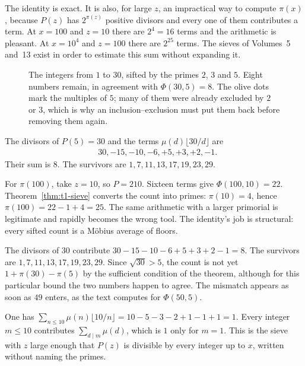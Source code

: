 The identity is exact. It is also, for large $z$, an impractical way to compute $\pi(x)$, because $P(z)$ has $2^{\pi(z)}$ positive divisors and every one of them contributes a term. At $x=100$ and $z=10$ there are $2^4=16$ terms and the arithmetic is pleasant. At $x=10^4$ and $z=100$ there are $2^{25}$ terms. The sieves of Volumes~5 and~13 exist in order to estimate this sum without expanding it.

\begin{figure}[ht]
\centering
{}
\caption{The integers from $1$ to $30$, sifted by the primes $2$, $3$ and $5$. Eight numbers remain, in agreement with $\Phi(30,5)=8$. The olive dots mark the multiples of $5$; many of them were already excluded by $2$ or $3$, which is why an inclusion--exclusion must put them back before removing them again.}
\label{fig:t1-sieve30}
\end{figure}

\begin{examplex}
The divisors of $P(5)=30$ and the terms $\mu(d)\lfloor30/d\rfloor$ are
\[
\begin{aligned}
&30,-15,-10,-6,+5,+3,+2,-1.
\end{aligned}
\]
Their sum is $8$. The survivors are $1,7,11,13,17,19,23,29$.

For $\pi(100)$, take $z=10$, so $P=210$. Sixteen terms give $\Phi(100,10)=22$. Theorem~\ref{thm:t1-sieve} converts the count into primes: $\pi(10)=4$, hence $\pi(100)=22-1+4=25$. The same arithmetic with a larger primorial is legitimate and rapidly becomes the wrong tool. The identity's job is structural: every sifted count is a M\"obius average of floors.
\end{examplex}

\begin{examplex}
The divisors of $30$ contribute $30-15-10-6+5+3+2-1=8$. The survivors are $1,7,11,13,17,19,23,29$. Since $\sqrt{30}>5$, the count is not yet $1+\pi(30)-\pi(5)$ by the sufficient condition of the theorem, although for this particular bound the two numbers happen to agree. The mismatch appears as soon as $49$ enters, as the text computes for $\Phi(50,5)$.
\end{examplex}

\begin{examplex}[the floor identity at $x=10$]
One has $\sum_{n\le 10}\mu(n)\lfloor 10/n\rfloor=10-5-3-2+1-1+1=1$. Every integer $m\le 10$ contributes $\sum_{d\mid m}\mu(d)$, which is $1$ only for $m=1$. This is the sieve with $z$ large enough that $P(z)$ is divisible by every integer up to $x$, written without naming the primes.
\end{examplex}

